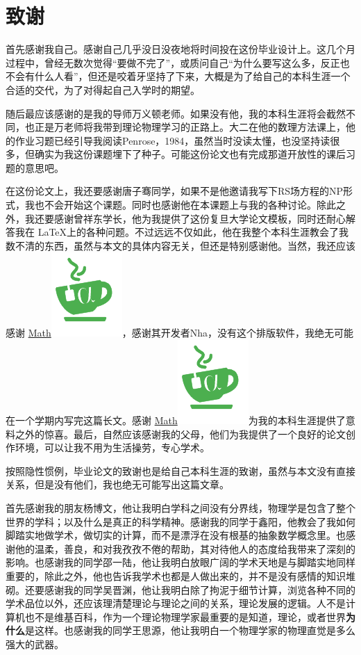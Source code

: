 \documentclass[oneside]{fduthesis}
\newcommand{\Mathcha}{\href{https://www.mathcha.io/}{\textcolor{mathcha}{\includegraphics*[scale=0.23,viewport=0 10 50 55]{mathchalogo.pdf}}}}
\begin{document}


\backmatter

\printbibliography

\chapter{致\quad 谢}

首先感谢我自己。感谢自己几乎没日没夜地将时间投在这份毕业设计上。这几个月过程中，曾经无数次觉得“要做不完了”，或质问自己“为什么要写这么多，反正也不会有什么人看”，但还是咬着牙坚持了下来，大概是为了给自己的本科生涯一个合适的交代，为了对得起自己入学时的期望。



随后最应该感谢的是我的导师万义顿老师。如果没有他，我的本科生涯将会截然不同，也正是万老师将我带到理论物理学习的正路上。大二在他的数理方法课上，他的作业习题已经引导我阅读Penrose，1984，虽然当时没读太懂，也没坚持读很多，但确实为我这份课题埋下了种子。可能这份论文也有完成那道开放性的课后习题的意思吧。



在这份论文上，我还要感谢唐子骞同学，如果不是他邀请我写下RS场方程的NP形式，我也不会开始这个课题。同时也感谢他在本课题上与我的各种讨论。除此之外，我还要感谢曾祥东学长，他为我提供了这份复旦大学论文模板，同时还耐心解答我在 \LaTeX 上的各种问题。不过远远不仅如此，他在我整个本科生涯教会了我数不清的东西，虽然与本文的具体内容无关，但还是特别感谢他。当然，我还应该感谢 \href{www.mathcha.io}{\textcolor{mathcha}{Math\Mathcha}}，感谢其开发者Nha，没有这个排版软件，我绝无可能在一个学期内写完这篇长文。感谢 \href{www.mathcha.io}{\textcolor{mathcha}{Math\Mathcha}}为我的本科生涯提供了意料之外的惊喜。最后，自然应该感谢我的父母，他们为我提供了一个良好的论文创作环境，可以让我不用为生活操劳，专心学术。



按照隐性惯例，毕业论文的致谢也是给自己本科生涯的致谢，虽然与本文没有直接关系，但是没有他们，我也绝无可能写出这篇文章。



首先感谢我的朋友杨博文，他让我明白学科之间没有分界线，物理学是包含了整个世界的学科；以及什么是真正的科学精神。感谢我的同学于鑫阳，他教会了我如何脚踏实地做学术，做切实的计算，而不是漂浮在没有根基的抽象数学概念里。也感谢他的温柔，善良，和对我孜孜不倦的帮助，其对待他人的态度给我带来了深刻的影响。也感谢我的同学邵一陆，他让我明白放眼广阔的学术天地是与脚踏实地同样重要的，除此之外，他也告诉我学术也都是人做出来的，并不是没有感情的知识堆砌。还要感谢我的同学吴晋渊，他让我明白除了拘泥于细节计算，浏览各种不同的学术品位以外，还应该理清楚理论与理论之间的关系，理论发展的逻辑。人不是计算机也不是维基百科，作为一个理论物理学家最重要的是知道，理论，或者世界\textbf{为什么}是这样。也感谢我的同学王思源，他让我明白一个物理学家的物理直觉是多么强大的武器。
\end{document}
